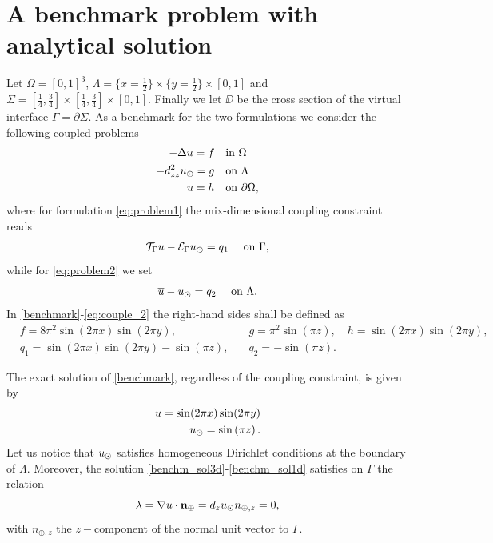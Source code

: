 \section{A benchmark problem with analytical solution}


Let $\Omega=[0,1]^3$, $\Lambda=\{x=\tfrac{1}{2}\}\times \{y=\tfrac{1}{2}\} \times [0,1] $
and $\Sigma=[\tfrac{1}{4}, \tfrac{3}{4}]\times [\tfrac{1}{4}, \tfrac{3}{4}]\times [0, 1]$.
Finally we let $\DD$ be the cross section of the virtual interface $\Gamma=\partial \Sigma$.
As a benchmark for the two formulations we consider the following coupled problems
%
\begin{subequations}\label{benchmark}
\begin{align}
\label{benchm_3d}
-\Delta u=f \quad &\text{in $\Omega$}\\
\label{benchm_1d}
-d_{zz}^2 \ud =g \quad &\text{on $\Lambda$}\\
u=h \quad &\text{on $\partial \Omega$},
\end{align}
\end{subequations}
where for formulation \eqref{eq:problem1} the mix-dimensional coupling constraint reads
\begin{equation}
  \label{eq:couple_1}
\trace{u} - \ext{\ud} = q_1\quad\text{ on }\Gamma,
\end{equation}
while for \eqref{eq:problem2} we set
\begin{equation}
    \label{eq:couple_2}
\avrc{u} - \ud = q_2\quad\text{ on }\Lambda.
\end{equation}
%
In \eqref{benchmark}-\eqref{eq:couple_2} the right-hand sides shall be defined as 
\begin{eqnarray*}
  &f=8\pi ^2 \sin (2\pi x) \sin (2\pi y),\quad &g={\pi ^2}\sin \left({\pi z}\right),\quad h=\sin (2\pi x) \sin (2\pi y),\\
  &q_1=\sin (2\pi x) \sin (2\pi y) - \sin \left({\pi z}\right),\quad &q_2=-\sin \left({\pi z}\right).
\end{eqnarray*}

The exact solution of \eqref{benchmark}, regardless of the coupling constraint,
is given by
%
\begin{eqnarray}
\label{benchm_sol3d}
u=\sin (2\pi x) \sin (2\pi y)\\
\label{benchm_sol1d}
\ud=\sin \left({\pi z}\right).
\end{eqnarray}
%
Let us notice that $u_{\odot}$ satisfies homogeneous Dirichlet conditions at the boundary of $\Lambda$.
Moreover, the solution \eqref{benchm_sol3d}-\eqref{benchm_sol1d} satisfies on $\Gamma$ the relation
\begin{equation}\label{benchm_flux}
\lambda=\nabla u \cdot \textbf{n}_{\oplus}=d_z \ud n_{\oplus,z}=0,
\end{equation}
with $n_{\oplus,z}$ the $z-$component of the normal unit vector to $\Gamma$.

